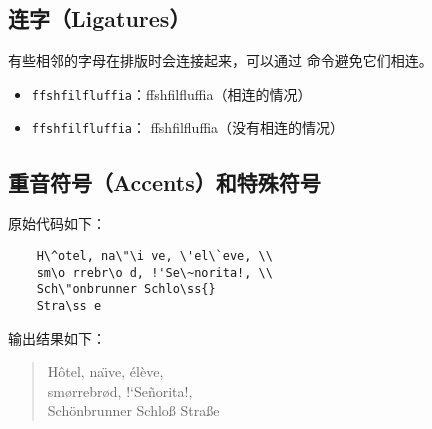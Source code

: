 \documentclass[UTF8]{ctexart}
\begin{document}
\subsection{连字（Ligatures）}
有些相邻的字母在排版时会连接起来，可以通过 \texttt{\mbox{}} 命令避免它们相连。
\begin{itemize}
    \item \texttt{ffshfilfluffia}：ffshfilfluffia（相连的情况）
    \item \texttt{f\mbox{}fshf\mbox{}ilf\mbox{}luf\mbox{}f\mbox{}ia}：
    f\mbox{}fshf\mbox{}ilf\mbox{}luf\mbox{}f\mbox{}ia（没有相连的情况）
\end{itemize}

\subsection{重音符号（Accents）和特殊符号}
原始代码如下：
\begin{verbatim}
    H\^otel, na\"\i ve, \'el\`eve, \\
    sm\o rrebr\o d, !'Se\~norita!, \\
    Sch\"onbrunner Schlo\ss{}
    Stra\ss e
\end{verbatim}

输出结果如下：
\begin{quote}
    H\^otel, na\"\i ve, \'el\`eve, \\
    sm\o rrebr\o d, !`Se\~norita!, \\
    Sch\"onbrunner Schlo\ss{}
    Stra\ss e
\end{quote}
\end{document}
